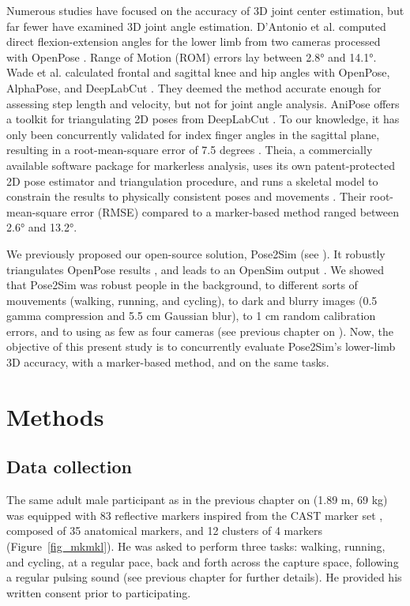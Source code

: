 Numerous studies have focused on the accuracy of 3D joint center estimation, but far fewer have examined 3D joint angle estimation. D’Antonio et al. computed direct flexion-extension angles for the lower limb from two cameras processed with OpenPose \cite{D'Antonio2021}. Range of Motion (ROM) errors lay between 2.8° and 14.1°. Wade et al. calculated frontal and sagittal knee and hip angles with OpenPose, AlphaPose, and DeepLabCut \cite{Wade2021}. They deemed the method accurate enough for assessing step length and velocity, but not for joint angle analysis. AniPose offers a toolkit for triangulating 2D poses from DeepLabCut \cite{Karashchuk2021}. To our knowledge, it has only been concurrently validated for index finger angles in the sagittal plane, resulting in a root-mean-square error of 7.5 degrees \cite{Geelen2021}. Theia, a commercially available software package for markerless analysis, uses its own patent-protected 2D pose estimator and triangulation procedure, and runs a skeletal model to constrain the results to physically consistent poses and movements \cite{Kanko2021b}. Their root-mean-square error (RMSE) compared to a marker-based method ranged between 2.6° and 13.2°.

We previously proposed our open-source solution, Pose2Sim (see  \cite{Pagnon2022b}). It robustly triangulates OpenPose results \cite{Cao2019}, and leads to an OpenSim output \cite{Delp2007, Seth2018}. We showed that Pose2Sim was robust people in the background, to different sorts of mouvements (walking, running, and cycling), to dark and blurry images (0.5 gamma compression and 5.5 cm Gaussian blur), to 1 cm random calibration errors, and to using as few as four cameras (see previous chapter on  \cite{Pagnon2021}). Now, the objective of this present study is to concurrently evaluate Pose2Sim’s lower-limb 3D accuracy, with a marker-based method, and on the same tasks.


\section{Methods}\label{sec:accuracy_methods}
\subsection{Data collection}

The same adult male participant as in the previous chapter on  (1.89 m, 69 kg) was equipped with 83 reflective markers inspired from the CAST marker set \cite{Cappozzo1995}, composed of 35 anatomical markers, and 12 clusters of 4 markers (Figure~\ref{fig_mkmkl}). He was asked to perform three tasks: walking, running, and cycling, at a regular pace, back and forth across the capture space, following a regular pulsing sound (see previous chapter for further details). He provided his written consent prior to participating.

